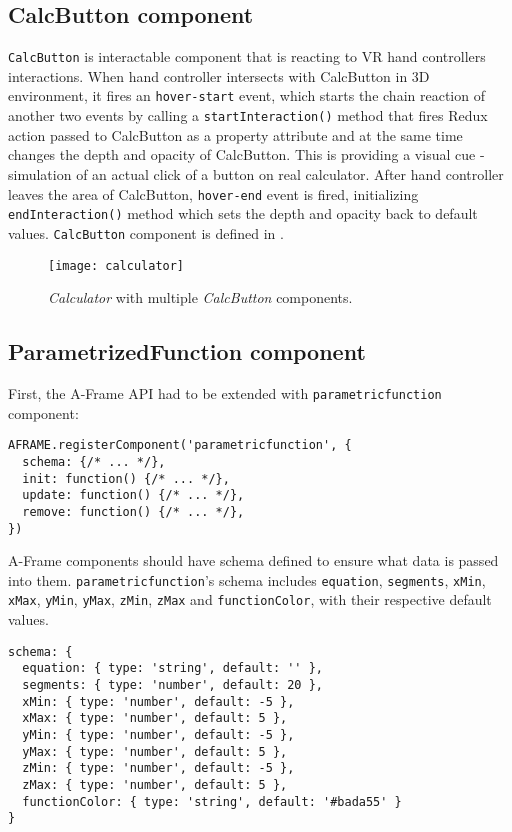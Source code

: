 \subsection{CalcButton component}
\texttt{CalcButton} is interactable component that is reacting to VR hand controllers interactions. When hand controller intersects with CalcButton in 3D environment, it fires an \texttt{hover-start} event, which starts the chain reaction of another two events by calling a \texttt{startInteraction()} method that fires Redux action passed to CalcButton as a property attribute and at the same time changes the depth and opacity of CalcButton. This is providing a visual cue - simulation of an actual click of a button on real calculator. After hand controller leaves the area of CalcButton, \texttt{hover-end} event is fired, initializing \texttt{endInteraction()} method which sets the depth and opacity back to default values. \texttt{CalcButton} component is defined in .

\begin{figure}[ht!]
\centering
\texttt{[image: calculator]}
\caption{\textsl{Calculator} with multiple \textsl{CalcButton} components.}
\label{r:64}
\end{figure}

\subsection{ParametrizedFunction component}
First, the A-Frame API had to be extended with \texttt{parametricfunction} component:

\begin{lstlisting}[caption={Registering new A-Frame component \texttt{'parametricfunction'}.},captionpos=b]
AFRAME.registerComponent('parametricfunction', {
  schema: {/* ... */}, 
  init: function() {/* ... */},
  update: function() {/* ... */},
  remove: function() {/* ... */},
})
\end{lstlisting}

A-Frame components should have schema defined to ensure what data is passed into them. \texttt{parametricfunction}'s schema includes \texttt{equation}, \texttt{segments}, \texttt{xMin}, \texttt{xMax}, \texttt{yMin}, \texttt{yMax}, \texttt{zMin}, \texttt{zMax} and  \texttt{functionColor}, with their respective default values.

\begin{lstlisting}[caption={\texttt{parametricfunction} A-Frame component schema with default values.},captionpos=b]
schema: {
  equation: { type: 'string', default: '' },
  segments: { type: 'number', default: 20 },
  xMin: { type: 'number', default: -5 },
  xMax: { type: 'number', default: 5 },
  yMin: { type: 'number', default: -5 },
  yMax: { type: 'number', default: 5 },
  zMin: { type: 'number', default: -5 },
  zMax: { type: 'number', default: 5 },
  functionColor: { type: 'string', default: '#bada55' }
}
\end{lstlisting}

